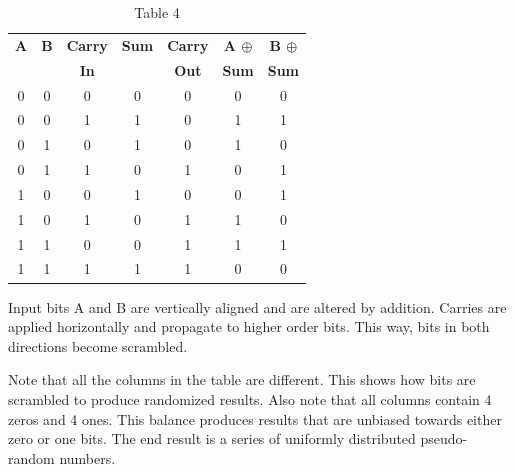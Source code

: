 \documentclass[preprint]{sigplanconf}
\begin{document}
\begin{table}
    \begin{center}
    \begin{tabular}{|c c c|c c|c c|}
        \hline
        \textbf{A} & \textbf{B} & \textbf{Carry} & \textbf{Sum} & \textbf{Carry} & \textbf{A $\oplus$} & \textbf{B $\oplus$} \\
                   &            & \textbf{In}    &              & \textbf{Out}   & \textbf{Sum}        & \textbf{Sum}        \\
        \hline
        0          & 0          & 0              & 0            & 0              & 0                   & 0                   \\
        0          & 0          & 1              & 1            & 0              & 1                   & 1                   \\
        0          & 1          & 0              & 1            & 0              & 1                   & 0                   \\
        0          & 1          & 1              & 0            & 1              & 0                   & 1                   \\
        1          & 0          & 0              & 1            & 0              & 0                   & 1                   \\
        1          & 0          & 1              & 0            & 1              & 1                   & 0                   \\
        1          & 1          & 0              & 0            & 1              & 1                   & 1                   \\
        1          & 1          & 1              & 1            & 1              & 0                   & 0                   \\
        \hline
    \end{tabular}
    \caption{Table 4}
    \label{tab-4}
\end{center}
\end{table}

Input bits A and B are vertically aligned and are altered by addition. Carries are applied horizontally and propagate to higher order bits. This way, bits in both directions become scrambled.

Note that all the columns in the table are different. This shows how bits are scrambled to produce randomized results. Also note that all columns contain 4 zeros and 4 ones. This balance produces results that are unbiased towards either zero or one bits. The end result is a series of uniformly distributed pseudo-random numbers.
\end{document}
